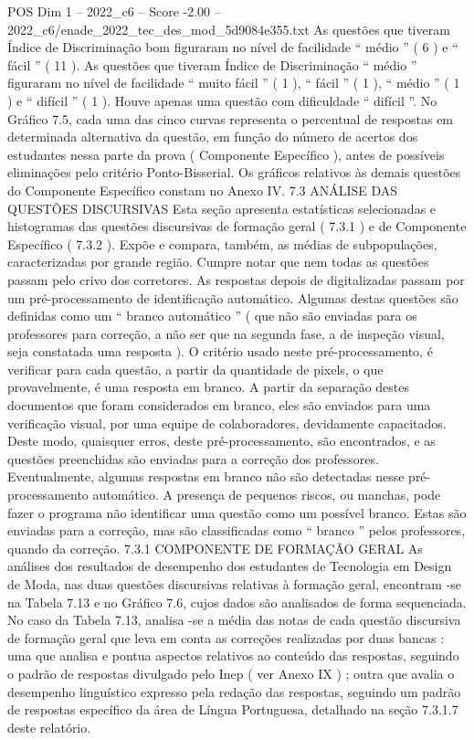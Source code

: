 \begin{textsample}{POS Dim 1 – 2022\_c6 – Score -2.00 – 2022\_c6/enade\_2022\_tec\_des\_mod\_5d9084e355.txt}
As questões que tiveram Índice de Discriminação bom figuraram no nível de facilidade “ médio ” ( 6 ) e “ fácil ” ( 11 ).
As questões que tiveram Índice de Discriminação “ médio ” figuraram no nível de facilidade “ muito fácil ” ( 1 ), “ fácil ” ( 1 ), “ médio ” ( 1 ) e “ difícil ” ( 1 ).
Houve apenas uma questão com dificuldade “ difícil ”.
No Gráfico 7.5, cada uma das cinco curvas representa o percentual de respostas em determinada alternativa da questão, em função do número de acertos dos estudantes nessa parte da prova ( Componente Específico ), antes de possíveis eliminações pelo critério Ponto-Bisserial.
Os gráficos relativos às demais questões do Componente Específico constam no Anexo IV. 7.3 ANÁLISE DAS QUESTÕES DISCURSIVAS Esta seção apresenta estatísticas selecionadas e histogramas das questões discursivas de formação geral ( 7.3.1 ) e de Componente Específico ( 7.3.2 ).
Expõe e compara, também, as médias de subpopulações, caracterizadas por grande região.
Cumpre notar que nem todas as questões passam pelo crivo dos corretores.
As respostas depois de digitalizadas passam por um pré-processamento de identificação automático.
Algumas destas questões são definidas como um “ branco automático ” ( que não são enviadas para os professores para correção, a não ser que na segunda fase, a de inspeção visual, seja constatada uma resposta ).
O critério usado neste pré-processamento, é verificar para cada questão, a partir da quantidade de pixels, o que provavelmente, é uma resposta em branco.
A partir da separação destes documentos que foram considerados em branco, eles são enviados para uma verificação visual, por uma equipe de colaboradores, devidamente capacitados.
Deste modo, quaisquer erros, deste pré-processamento, são encontrados, e as questões preenchidas são enviadas para a correção dos professores.
Eventualmente, algumas respostas em branco não são detectadas nesse pré-processamento automático.
A presença de pequenos riscos, ou manchas, pode fazer o programa não identificar uma questão como um possível branco.
Estas são enviadas para a correção, mas são classificadas como “ branco ” pelos professores, quando da correção. 7.3.1 COMPONENTE DE FORMAÇÃO GERAL As análises dos resultados de desempenho dos estudantes de Tecnologia em Design de Moda, nas duas questões discursivas relativas à formação geral, encontram -se na Tabela 7.13 e no Gráfico 7.6, cujos dados são analisados de forma sequenciada.
No caso da Tabela 7.13, analisa -se a média das notas de cada questão discursiva de formação geral que leva em conta as correções realizadas por duas bancas : uma que analisa e pontua aspectos relativos ao conteúdo das respostas, seguindo o padrão de respostas divulgado pelo Inep ( ver Anexo IX ) ; outra que avalia o desempenho linguístico expresso pela redação das respostas, seguindo um padrão de respostas específico da área de Língua Portuguesa, detalhado na seção 7.3.1.7 deste relatório.

\end{textsample}
